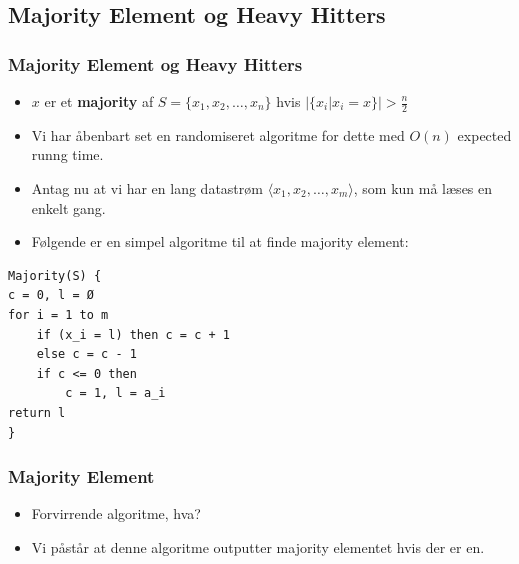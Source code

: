 \documentclass{beamer}
\begin{document}
\subsection{Majority Element og Heavy Hitters}
\label{subsec:label}


\begin{frame}[fragile]
  \frametitle{Majority Element og Heavy Hitters}
    \begin{itemize}
    \item $x$ er et \textbf{majority} af $S = \{x_{1}, x_{2}, \ldots, x_{n}\}$ hvis $|\{x_{i} | x_{i} = x\}| > \frac{n}{2}$
    \item Vi har åbenbart set en randomiseret algoritme for dette med $O(n)$ expected runng time. 
    \item Antag nu at vi har en lang datastrøm $\langle x_{1}, x_{2}, \ldots, x_{m} \rangle$, som kun må læses en enkelt gang. 
    \item Følgende er en simpel algoritme til at finde majority element: 
    \end{itemize}
    \begin{verbatim}
Majority(S) {
c = 0, l = Ø
for i = 1 to m
    if (x_i = l) then c = c + 1
    else c = c - 1
    if c <= 0 then
        c = 1, l = a_i
return l
}

\end{verbatim}
\end{frame}

\begin{frame}[allowframebreaks]
  \frametitle{Majority Element}
  \begin{itemize}
  \item Forvirrende algoritme, hva? 
  \item Vi påstår at denne algoritme outputter majority elementet hvis der er en. 
  \end{itemize}
\end{frame}
\end{document}
